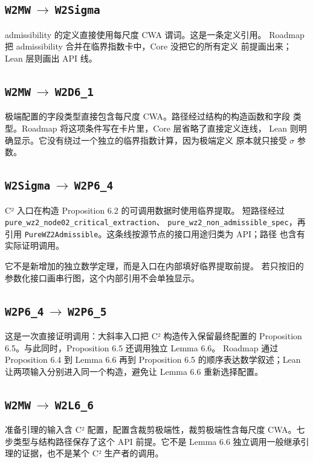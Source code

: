 \documentclass[UTF8,11pt,a4paper,fontset=none]{ctexart}
\DeclareRobustCommand{\id}[1]{\nolinkurl{#1}}
\newcommand{\arr}[2]{\id{#1}\,$\longrightarrow$\,\id{#2}}
\begin{document}
\subsection{\texorpdfstring{\arr{W2MW}{W2Sigma}}{W2MW 到 W2Sigma}}

admissibility 的定义直接使用每尺度 CWA 谓词。这是一条定义引用。
Roadmap 把 admissibility 合并在临界指数卡中，Core 没把它的所有定义
前提画出来；Lean 层则画出 API 线。

\subsection{\texorpdfstring{\arr{W2MW}{W2D6_1}}{W2MW 到 W2D6\_1}}

极端配置的字段类型直接包含每尺度 CWA。路径经过结构的构造函数和字段
类型。Roadmap 将这项条件写在卡片里，Core 层省略了直接定义连线，
Lean 则明确显示。它没有绕过一个独立的临界指数计算，因为极端定义
原本就只接受 $\sigma$ 参数。

\subsection{\texorpdfstring{\arr{W2Sigma}{W2P6_4}}{W2Sigma 到 W2P6\_4}}

C² 入口在构造 Proposition 6.2 的可调用数据时使用临界提取。
短路径经过 \id{pure_wz2_node02_critical_extraction}、
\id{pure_wz2_non_admissible_spec}，再引用
\id{PureWZ2Admissible}。这条线按源节点的接口用途归类为 API；路径
也含有实际证明调用。

它不是新增加的独立数学定理，而是入口在内部填好临界提取前提。
若只按旧的参数化接口画串行图，这个内部引用不会单独显示。

\subsection{\texorpdfstring{\arr{W2P6_4}{W2P6_5}}{W2P6\_4 到 W2P6\_5}}

这是一次直接证明调用：大斜率入口把 C² 构造传入保留最终配置的
Proposition 6.5。与此同时，Proposition 6.5 还调用独立 Lemma 6.6。
Roadmap 通过 Proposition 6.4 到 Lemma 6.6 再到 Proposition 6.5
的顺序表达数学叙述；Lean 让两项输入分别进入同一个构造，避免让
Lemma 6.6 重新选择配置。

\subsection{\texorpdfstring{\arr{W2MW}{W2L6_6}}{W2MW 到 W2L6\_6}}

准备引理的输入含 C² 配置，配置含裁剪极端性，裁剪极端性含每尺度
CWA。七步类型与结构路径保存了这个 API 前提。它不是 Lemma 6.6
独立调用一般继承引理的证据，也不是某个 C² 生产者的调用。
\end{document}

